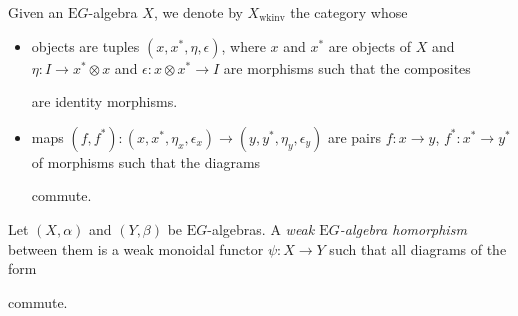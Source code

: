 \begin{defn} Given an $\mathrm{E}G$-algebra $X$, we denote by $X_{\mathrm{wkinv}}$ the category whose
\begin{itemize}
\item objects are tuples $(x, x^*, \eta, \epsilon)$, where $x$ and $x^*$ are objects of $X$ and $\eta: I \to x^* \otimes x$ and $\epsilon : x \otimes x^* \to I$ are morphisms such that the composites
\begin{eq*}  \end{eq*}
are identity morphisms.
\item maps $(f, f^*): (x, x^*, \eta_x, \epsilon_x) \to (y, y^*, \eta_y, \epsilon_y)$ are pairs $f: x \to y$, $f^* : x^* \to y^*$ of morphisms such that the diagrams
\begin{eq*}  \end{eq*}
commute.
\end{itemize}
\end{defn}

\begin{defn}\label{weakmonfunc} Let $(X, \alpha)$ and $(Y, \beta)$ be $\mathrm{E}G$-algebras. A \emph{weak $\mathrm{E}G$-algebra homorphism} between them is a weak monoidal functor $\psi: X \to Y$ such that all diagrams of the form
\begin{eq*}  \end{eq*}
commute.
\end{defn} 

